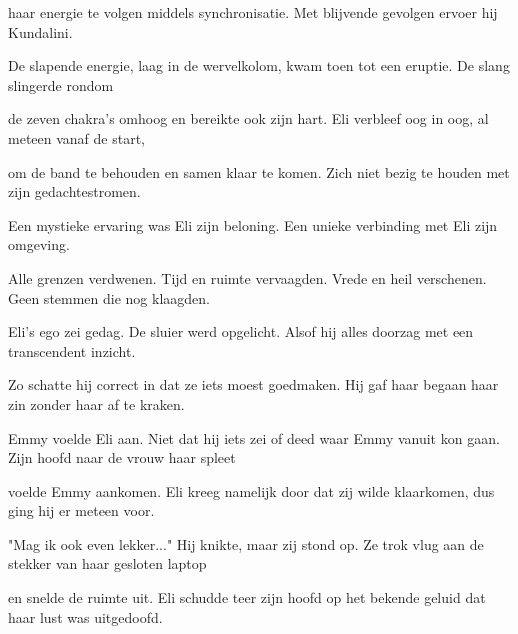 haar energie te volgen
middels synchronisatie.
Met blijvende gevolgen
ervoer hij Kundalini.

De slapende energie,
laag in de wervelkolom,
kwam toen tot een eruptie.
De slang slingerde rondom

de zeven chakra’s omhoog
en bereikte ook zijn hart.
Eli verbleef oog in oog,
al meteen vanaf de start,

om de band te behouden
en samen klaar te komen.
Zich niet bezig te houden
met zijn gedachtestromen.

Een mystieke ervaring
was Eli zijn beloning.
Een unieke verbinding
met Eli zijn omgeving.

Alle grenzen verdwenen.
Tijd en ruimte vervaagden.
Vrede en heil verschenen.
Geen stemmen die nog klaagden.

Eli’s ego zei gedag.
De sluier werd opgelicht.
Alsof hij alles doorzag
met een transcendent inzicht.

Zo schatte hij correct in
dat ze iets moest goedmaken.
Hij gaf haar begaan haar zin
zonder haar af te kraken.

Emmy voelde Eli aan.
Niet dat hij iets zei of deed
waar Emmy vanuit kon gaan.
Zijn hoofd naar de vrouw haar spleet

voelde Emmy aankomen.
Eli kreeg namelijk door
dat zij wilde klaarkomen,
dus ging hij er meteen voor.

"Mag ik ook even lekker..."
Hij knikte, maar zij stond op.
Ze trok vlug aan de stekker
van haar gesloten laptop

en snelde de ruimte uit.
Eli schudde teer zijn hoofd
op het bekende geluid
dat haar lust was uitgedoofd.
